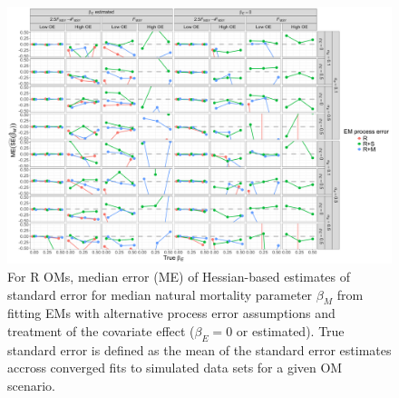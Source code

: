 \documentclass[
  12pt,
]{article}
\begin{document}
\begin{landscape}
\begin{figure}
\begin{center}
\includegraphics[height = \textheight]{se_beta_M_bias_Rom}
\end{center}
\caption{For R OMs, median error (ME) of Hessian-based estimates of standard error for median natural mortality parameter $\beta_M$ from fitting EMs with alternative process error assumptions and treatment of the covariate effect ($\beta_ E= 0$ or estimated). True standard error is defined as the mean of the standard error estimates accross converged fits to simulated data sets for a given OM scenario.}\label{se_beta_M_bias_Rom}
\end{figure}
\end{landscape}
\end{document}
